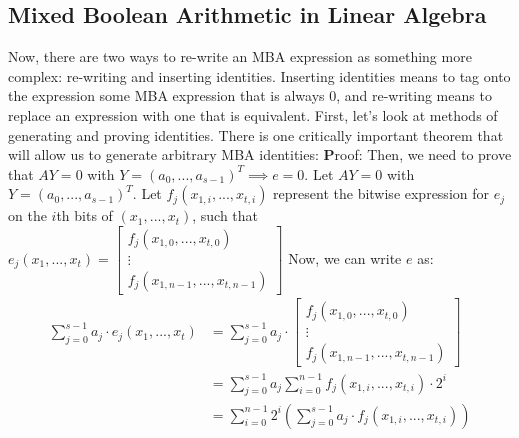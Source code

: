 \subsection{Mixed Boolean Arithmetic in Linear Algebra}
Now, there are two ways to re-write an MBA expression as something more complex:
re-writing and inserting identities. Inserting identities means to tag onto
the expression some MBA expression that is always 0, and re-writing means to
replace an expression with one that is equivalent. First, let's look at methods
of generating and proving identities. There is one critically important theorem
that will allow us to generate arbitrary MBA identities:
{\textbf Proof:} Then, we need to prove that $AY = 0$ with $Y = (a_0, ..., a_{s-1})^T \implies e = 0$.
    Let $A Y = 0$ with $Y = (a_0, ..., a_{s-1})^T$. Let $f_j(x_{1,i}, ..., x_{t, i})$
    represent the bitwise expression for $e_j$ on the $i$th bits of $(x_1, ..., x_t)$,
    such that $e_j(x_1, ..., x_t) = \begin{bmatrix}
        f_j(x_{1,0}, ..., x_{t, 0})\\
        \vdots \\
        f_j(x_{1,n-1}, ..., x_{t, n-1})
    \end{bmatrix}$
    Now, we can write
    $e$ as:
    \begin{align*}
        \sum_{j=0}^{s-1}a_j \cdot e_j(x_1, ..., x_t) &= \sum_{j=0}^{s-1} a_j \cdot \begin{bmatrix}
        f_j(x_{1,0}, ..., x_{t, 0})\\
        \vdots \\
        f_j(x_{1,n-1}, ..., x_{t, n-1})
        \end{bmatrix}\\
                                                     &= \sum_{j=0}^{s-1} a_j \sum_{i=0}^{n-1} f_j(x_{1,i}, ..., x_{t, i}) \cdot 2^{i}\\
                                                     &= \sum_{i=0}^{n-1} 2^i
                                                     \left(\sum_{j=0}^{s-1} a_j
                                                     \cdot f_j(x_{1,i}, ...,
                                                     x_{t, i}) \right)
    \end{align*}
